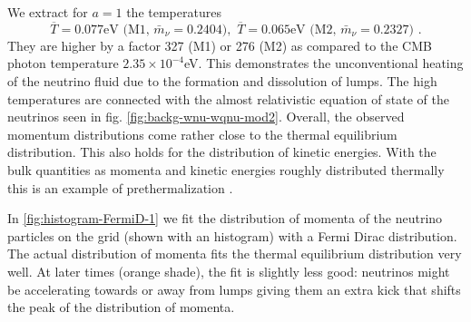 We extract for $a=1$ the temperatures 
\begin{equation}
\overline{T}=0.077\mbox{eV}\,\,\mbox{(M1, }\bar{m}_{\nu}=0.2404\mbox{)},\,\,\overline{T}=0.065\mbox{eV}\,\,\mbox{(M2, }\bar{m}_{\nu}=0.2327\mbox{)}\,\,.
\end{equation}
They are higher by a factor 327 (M1) or 276 (M2) as compared to the
CMB photon temperature $2.35\times10^{-4}$eV. This demonstrates the
unconventional heating of the neutrino fluid due to the formation
and dissolution of lumps. The high temperatures are connected with
the almost relativistic equation of state of the neutrinos seen in
fig. \ref{fig:backg-wnu-wqnu-mod2}. Overall, the observed momentum
distributions come rather close to the thermal equilibrium distribution.
This also holds for the distribution of kinetic energies. With the
bulk quantities as momenta and kinetic energies roughly distributed
thermally this is an example of prethermalization \cite{berges_prethermalization_2004}.

In \cref{fig:histogram-FermiD-1} we fit the distribution of
momenta of the neutrino particles on the grid (shown with an histogram)
with a Fermi Dirac distribution. The actual distribution of momenta
fits the thermal equilibrium distribution very well. At later times
(orange shade), the fit is slightly less good: neutrinos might be
accelerating towards or away from lumps giving them an extra kick
that shifts the peak of the distribution of momenta.

